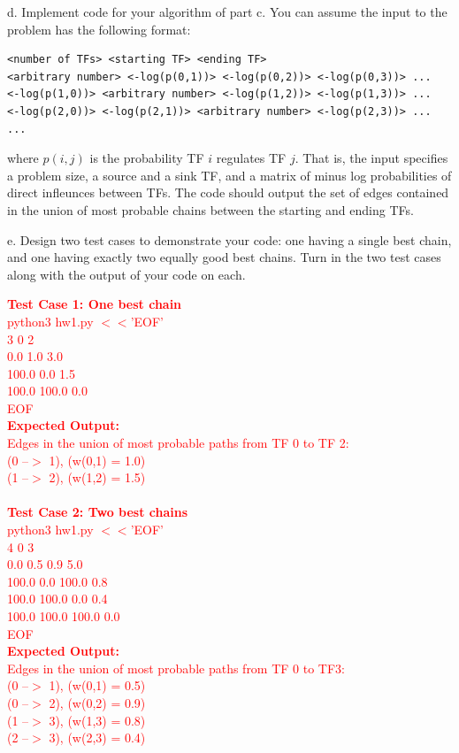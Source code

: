\documentclass[11pt]{article}
\begin{document}
d. Implement code for your algorithm of part c.  You can assume the input to the problem has the following format:

\begin{verbatim}
<number of TFs> <starting TF> <ending TF>
<arbitrary number> <-log(p(0,1))> <-log(p(0,2))> <-log(p(0,3))> ...
<-log(p(1,0))> <arbitrary number> <-log(p(1,2))> <-log(p(1,3))> ...
<-log(p(2,0))> <-log(p(2,1))> <arbitrary number> <-log(p(2,3))> ...
...
\end{verbatim}
where $p(i,j)$ is the probability TF $i$ regulates TF $j$.
That is, the input specifies a problem size, a source and a sink
TF, and a matrix of minus log probabilities of direct infleunces
between TFs.  The code should output the set of edges contained in
the union of most probable chains between the starting and ending
TFs.

e. Design two test cases to demonstrate your code: one having a single
best chain, and one having exactly two equally good best chains.  Turn
in the two test cases along with the output of your code on each.

\textcolor{red}{
\textbf{Test Case 1: One best chain}\\
python3 hw1.py $<<$'EOF'\\
3 0 2\\
0.0 1.0 3.0\\
100.0 0.0 1.5\\
100.0 100.0 0.0\\
EOF\\
\textbf{Expected Output:}\\
Edges in the union of most probable paths from TF 0 to TF 2:\\
(0 --$>$ 1), (w(0,1) = 1.0)\\
(1 --$>$ 2), (w(1,2) = 1.5)\\\\
\textbf{Test Case 2: Two best chains}\\
python3 hw1.py $<<$'EOF'\\
4 0 3\\
0.0 0.5 0.9 5.0\\
100.0 0.0 100.0 0.8\\
100.0 100.0 0.0 0.4\\
100.0 100.0 100.0 0.0\\
EOF\\
\textbf{Expected Output:}\\
Edges in the union of most probable paths from TF 0 to TF3:\\
(0 --$>$ 1), (w(0,1) = 0.5)\\
(0 --$>$ 2), (w(0,2) = 0.9)\\
(1 --$>$ 3), (w(1,3) = 0.8)\\
(2 --$>$ 3), (w(2,3) = 0.4)
}
\end{document}
